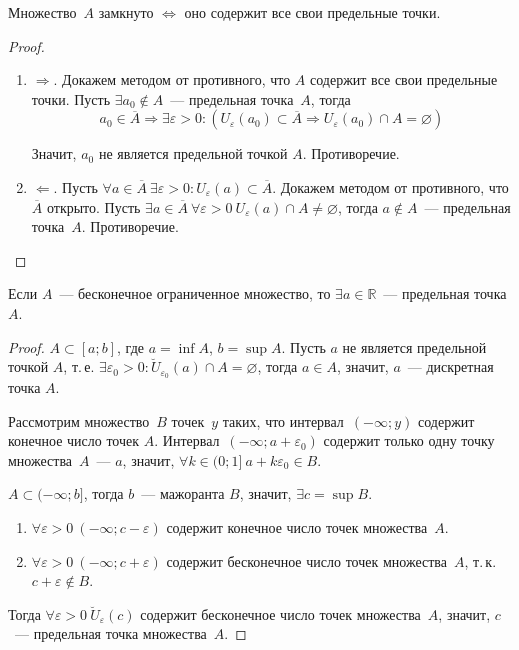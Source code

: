 \begin{statement}
Множество~$A$ замкнуто $\Leftrightarrow$ оно содержит все свои предельные точки.
\end{statement}
\begin{proof}
\begin{enumerate}
	\item $\Rightarrow$. Докажем методом от противного, что $A$ содержит все свои предельные точки.
	Пусть $\exists a_0 \notin A$~--- предельная точка~$A$, тогда
	\begin{equation*}
	a_0 \in \overline A \Rightarrow \exists \varepsilon > 0 \colon (U_\varepsilon(a_0) \subset \overline A \Rightarrow U_\varepsilon(a_0) \cap A = \varnothing)
	\end{equation*}
	
	Значит, $a_0$ не является предельной точкой $A$.
	Противоречие.
	
	\item $\Leftarrow$. Пусть $\forall a \in \overline A \ \exists \varepsilon > 0 \colon U_\varepsilon(a) \subset \overline A$.
	Докажем методом от противного, что $\overline A$ открыто.
	Пусть $\exists a \in \overline A \ \forall \varepsilon > 0 \ U_\varepsilon(a) \cap A \neq \varnothing$, тогда $a \notin A$~--- предельная точка~$A$.
	Противоречие.
\end{enumerate}
\end{proof}

\begin{theorem}[Вейерштрасса]
\label{th:Weierstrass}
Если $A$~--- бесконечное ограниченное множество, то $\exists a \in \mathbb R$~--- предельная точка $A$.
\end{theorem}
\begin{proof}
$A \subset [a; b]$, где $a = \inf A$, $b = \sup A$.
Пусть $a$ не является предельной точкой $A$, т.\,е. $\exists \varepsilon_0 > 0 \colon \breve U_{\varepsilon_0}(a) \cap A = \varnothing$, тогда $a \in A$, значит, $a$~--- дискретная точка $A$.

Рассмотрим множество~$B$ точек~$y$ таких, что интервал~$(-\infty; y)$ содержит конечное число точек $A$.
Интервал~$(-\infty; a + \varepsilon_0)$ содержит только одну точку множества~$A$~--- $a$, значит, $\forall k \in (0; 1] \ a + k\varepsilon_0 \in B$.

$A \subset (-\infty; b]$, тогда $b$~--- мажоранта $B$, значит, $\exists c = \sup B$.
\begin{enumerate}
	\item $\forall \varepsilon > 0 \ (-\infty; c - \varepsilon)$ содержит конечное число точек множества~$A$.
	\item $\forall \varepsilon > 0 \ (-\infty; c + \varepsilon)$ содержит бесконечное число точек множества~$A$, т.\,к. $c + \varepsilon \notin B$.
\end{enumerate}

Тогда $\forall \varepsilon > 0 \ \breve U_\varepsilon(c)$ содержит бесконечное число точек множества~$A$, значит, $c$~--- предельная точка множества~$A$.
\end{proof}